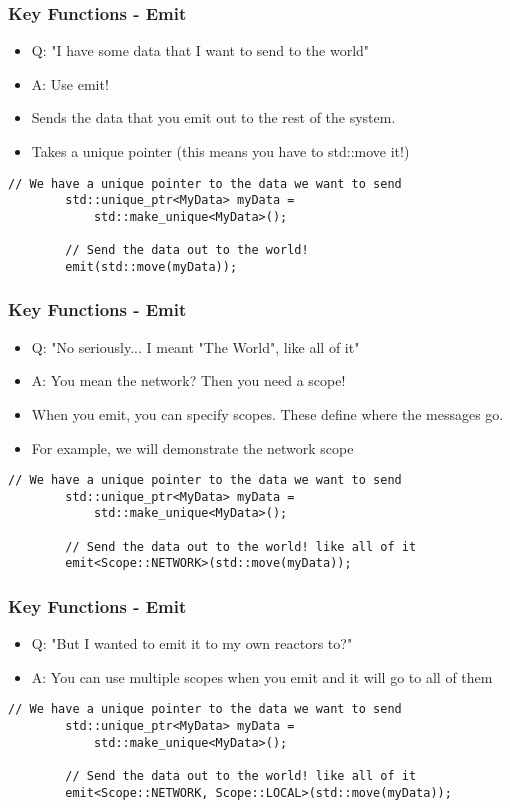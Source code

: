 \documentclass{beamer}
\begin{document}
\begin{frame}[fragile]
	\frametitle{Key Functions - Emit}
	\begin{itemize}
		\item Q: "I have some data that I want to send to the world"
		\item A: Use emit!
		\item Sends the data that you emit out to the rest of the system.
		\item Takes a unique pointer (this means you have to std::move it!)
	\end{itemize}

	\begin{lstlisting}[language=nuclear]
		// We have a unique pointer to the data we want to send
		std::unique_ptr<MyData> myData = 
		    std::make_unique<MyData>();
		
		// Send the data out to the world!
		emit(std::move(myData));
	\end{lstlisting}
\end{frame}

\begin{frame}[fragile]
	\frametitle{Key Functions - Emit}
	\begin{itemize}
		\item Q: "No seriously... I meant "The World", like all of it"
		\item A: You mean the network? Then you need a scope!
		\item When you emit, you can specify scopes. These define where the messages go.
		\item For example, we will demonstrate the network scope
	\end{itemize}

	\begin{lstlisting}[language=nuclear]
		// We have a unique pointer to the data we want to send
		std::unique_ptr<MyData> myData = 
		    std::make_unique<MyData>();
		
		// Send the data out to the world! like all of it
		emit<Scope::NETWORK>(std::move(myData));
	\end{lstlisting}
\end{frame}

\begin{frame}[fragile]
	\frametitle{Key Functions - Emit}
	\begin{itemize}
		\item Q: "But I wanted to emit it to my own reactors to?"
		\item A: You can use multiple scopes when you emit and it will go to all of them
	\end{itemize}

	\begin{lstlisting}[language=nuclear]
		// We have a unique pointer to the data we want to send
		std::unique_ptr<MyData> myData = 
		    std::make_unique<MyData>();
		
		// Send the data out to the world! like all of it
		emit<Scope::NETWORK, Scope::LOCAL>(std::move(myData));
	\end{lstlisting}
\end{frame}
\end{document}

